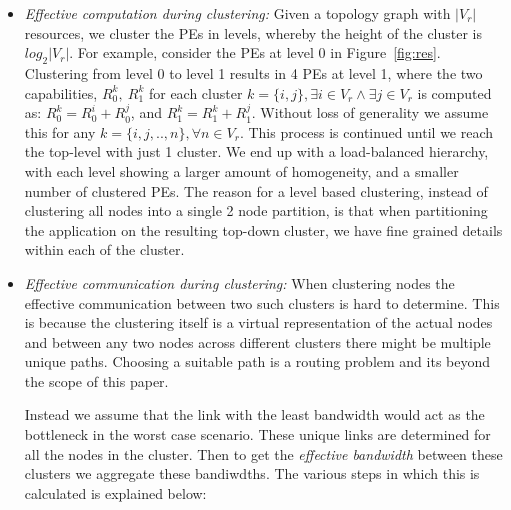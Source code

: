 \begin{itemize}

\item \textit{Effective computation during clustering:} Given a
  topology graph with $|V_r|$ resources, we cluster the PEs in levels,
  whereby the height of the cluster is $log_2|V_r|$. For example,
  consider the PEs at level 0 in Figure~\ref{fig:res}. Clustering from
  level 0 to level 1 results in 4 PEs at level 1, where the two
  capabilities, $R^k_0,\ R^k_1$ for each cluster $k = \{i, j\},
  \exists i \in V_r \wedge \exists j \in V_r$ is computed as: $R^k_0 =
  R^i_0 + R^j_0$, and $R^k_1 = R^k_1 + R^j_1$. Without loss of
  generality we assume this for any $k = \{i,j,..,n\}, \forall n \in
  V_r$. This process is continued until we reach the top-level with just
  1 cluster. We end up with a load-balanced hierarchy, with each
  level showing a larger amount of homogeneity, and a smaller number of
  clustered PEs. The reason for a level based clustering, instead of
  clustering all nodes into a single 2 node partition, is that when
  partitioning the application on the resulting top-down cluster, we
  have fine grained details within each of the cluster.



\item \textit{Effective communication during clustering:}
  When clustering nodes the effective communication between two such clusters is
  hard to determine. This is because the clustering itself is a virtual
  representation of the actual nodes and between any two nodes across different
  clusters there might be multiple unique paths. Choosing a suitable path is a routing
  problem and its beyond the scope of this paper.

  Instead we assume that the link with the least bandwidth would act as the
  bottleneck in the worst case scenario. These unique links are determined
  for all the nodes in the cluster. Then to get the \textit{effective
  bandwidth} between these clusters we aggregate these bandiwdths.
  The various steps in which this is calculated is explained below:


\end{itemize}
